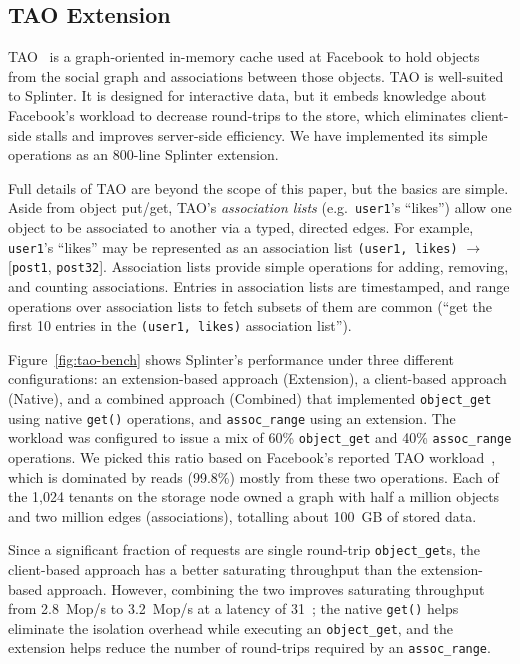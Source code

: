\subsection{TAO Extension}



TAO~\cite{tao-2013} is a graph-oriented in-memory cache used at Facebook to hold
  objects from the social graph and associations between those objects.
TAO is well-suited to Splinter.
It is designed for interactive data, but it embeds knowledge
  about Facebook's workload to decrease round-trips to the store, which
  eliminates client-side stalls and improves server-side efficiency.
We have implemented its simple operations as an 800-line Splinter extension.

Full details of TAO are beyond the scope of this paper, but the basics are
  simple. Aside from object put/get, TAO's \textsl{association lists} (e.g.\
  \texttt{user1}'s ``likes'') allow one object to be
  associated to another via a typed, directed edges.
For example, \texttt{user1}'s ``likes'' may be represented as an association list
  \texttt{(user1, likes)} $\rightarrow$ [\texttt{post1}, \texttt{post32}].
Association lists provide simple operations for adding, removing, and counting
  associations. Entries in association lists are timestamped, and range operations
  over association lists to fetch subsets of them are common (``get the first 10 entries in
  the \texttt{(user1, likes)} association list'').

Figure~\ref{fig:tao-bench} shows Splinter's performance under three
different configurations: an extension-based approach (Extension), a
client-based approach (Native), and a combined approach (Combined) that implemented
\texttt{object\_get} using native \texttt{get()} operations, and
\texttt{assoc\_range} using an extension.
The workload was configured to
issue a mix of 60\%
  \texttt{object\_get} and 40\% \texttt{assoc\_range} operations.
We picked this ratio based on Facebook's reported TAO workload~\cite{tao-2013},
  which is dominated by reads (99.8\%) mostly from these two operations.
Each of the 1,024 tenants on the storage node owned a graph with half a million
  objects and two million edges (associations), totalling about 100~GB of
  stored data.

Since a significant fraction of requests are single round-trip
\texttt{object\_get}s, the client-based approach has a better
saturating throughput than the extension-based approach. However,
combining the two improves
saturating throughput from 2.8~Mop/s to 3.2~Mop/s at a latency of
31~\us;
the native \texttt{get()} helps eliminate the isolation
overhead while executing an \texttt{object\_get}, and the extension helps
reduce the number of round-trips required by an \texttt{assoc\_range}.

